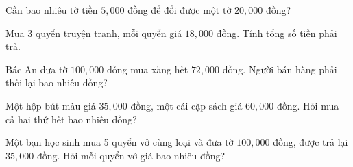 \begin{ex} %
Cần bao nhiêu tờ tiền $5,000$ đồng để đổi được một tờ $20,000$ đồng?
\end{ex}

\begin{ex} %
Mua 3 quyển truyện tranh, mỗi quyển giá $18,000$ đồng. Tính tổng số tiền phải trả.
\end{ex}

\begin{ex} %
Bác An đưa tờ $100,000$ đồng mua xăng hết $72,000$ đồng. Người bán hàng phải thối lại bao nhiêu đồng?
\end{ex}

\begin{ex} %
Một hộp bút màu giá $35,000$ đồng, một cái cặp sách giá $60,000$ đồng. Hỏi mua cả hai thứ hết bao nhiêu đồng?
\end{ex}

\begin{ex} %
Một bạn học sinh mua 5 quyển vở cùng loại và đưa tờ $100,000$ đồng, được trả lại $35,000$ đồng. Hỏi mỗi quyển vở giá bao nhiêu đồng?
\end{ex}
